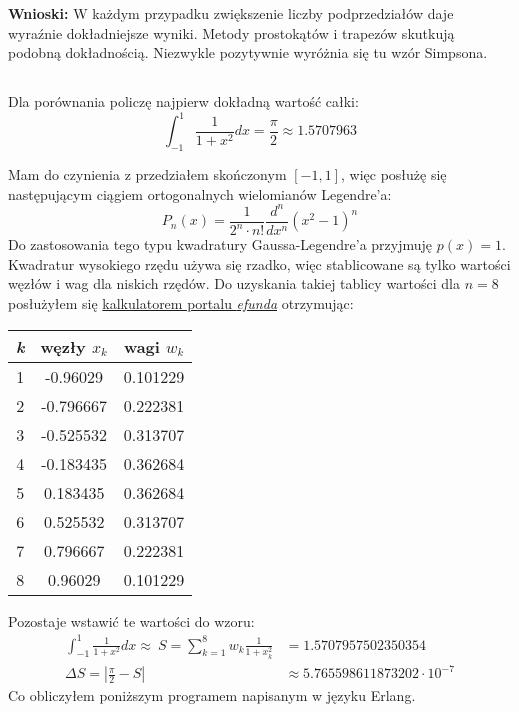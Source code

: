 \documentclass{article}
\begin{document}
\noindent
\textbf{Wnioski:} W każdym przypadku zwiększenie liczby podprzedziałów daje wyraźnie dokładniejsze wyniki. Metody prostokątów i trapezów skutkują podobną dokładnością. Niezwykle pozytywnie wyróżnia się tu wzór Simpsona.

\subsection{}
Dla porównania policzę najpierw dokładną wartość całki:
\[\int_{-1}^1 \frac{1}{1 + x^2}dx = \frac{\pi}{2} \approx 1.5707963\]

\noindent
Mam do czynienia z przedziałem skończonym \([-1, 1]\), więc posłużę się następującym ciągiem ortogonalnych wielomianów Legendre'a:
\[P_n(x) = \frac{1}{2^n \cdot n!} \frac{d^n}{dx^n}(x^2 - 1)^n\]
Do zastosowania tego typu kwadratury Gaussa-Legendre'a przyjmuję \(p(x) = 1\).\\
Kwadratur wysokiego rzędu używa się rzadko, więc stablicowane są tylko wartości węzłów i wag dla niskich rzędów. Do uzyskania takiej tablicy wartości dla \(n=8\) posłużyłem się \href{https://www.efunda.com/math/num_integration/findgausslegendre.cfm}{kalkulatorem portalu \textit{efunda}} otrzymując:

\begin{table}[h]
    \centering
    \begin{tabular}{c|c|c}
        \textit{k} & węzły \(x_k\) & wagi \(w_k\)\\
        \hline
        1 & -0.96029 & 0.101229\\
        2 & -0.796667 & 0.222381\\
        3 & -0.525532 & 0.313707\\
        4 & -0.183435 & 0.362684\\
        5 & 0.183435 & 0.362684\\
        6 & 0.525532 & 0.313707\\
        7 & 0.796667 & 0.222381\\
        8 & 0.96029 & 0.101229
    \end{tabular}
    \label{tab:table1}
\end{table}

\noindent
Pozostaje wstawić te wartości do wzoru:
\begin{align*}
    \int_{-1}^1 \frac{1}{1 + x^2}dx \approx\ S = \sum_{k=1}^8 w_k \frac{1}{1 + x_k^2} &= 1.5707957502350354\\
    \Delta S = \left|\frac{\pi}{2} - S\right| &\approx 5.765598611873202 \cdot 10^{-7}
\end{align*}
Co obliczyłem poniższym programem napisanym w języku Erlang.
\end{document}

